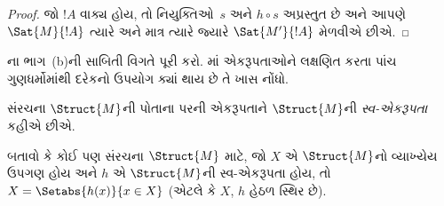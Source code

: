 \documentclass[../../../include/open-logic-section]{subfiles}
\begin{document}
\begin{proof}
જો $!A$ વાક્ય હોય, તો નિયુક્તિઓ~$s$ અને $h \circ s$ અપ્રસ્તુત છે અને
આપણે $\Sat{M}{!A}$ ત્યારે અને માત્ર ત્યારે જ્યારે $\Sat{M'}{!A}$ મેળવીએ છીએ.
\end{proof}

\begin{prob}
ના ભાગ~(b)ની સાબિતી વિગતે પૂરી કરો.
માં એકરૂપતાઓને લક્ષણિત કરતા પાંચ
ગુણધર્મોમાંથી દરેકનો ઉપયોગ ક્યાં થાય છે તે ખાસ નોંધો.
\end{prob}

\begin{defn}
સંરચના $\Struct{M}$ની પોતાના પરની એકરૂપતાને $\Struct{M}$ની
\emph{સ્વ-એકરૂપતા} કહીએ છીએ.
\end{defn}

\begin{prob}
બતાવો કે કોઈ પણ સંરચના $\Struct{M}$ માટે, જો $X$ એ $\Struct{M}$નો
વ્યાખ્યેય ઉપગણ હોય અને $h$ એ $\Struct{M}$ની સ્વ-એકરૂપતા હોય, તો
$X = \Setabs{h(x)}{x \in X}$ (એટલે કે $X$, $h$ હેઠળ સ્થિર છે).
\end{prob}
\end{document}
